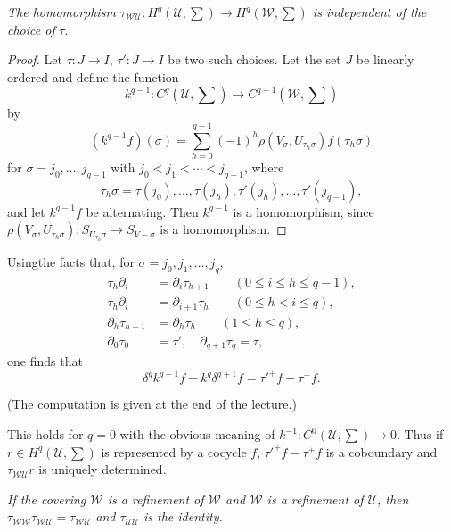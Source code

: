 \textit{The homomorphism $\tau_{\mathscr{W} \mathscr{U}} : H^q
  (\mathscr{U}, \sum) \to H^q (\mathscr{W}, \sum) $ is independent of
  the choice of}  $\tau$. 

\begin{proof}%
Let $\tau : J \to I$, $\tau' : J \to I$ be two such choices. Let the
set $J$ be linearly ordered and define the function 
$$
k^{q-1} : C^q (\mathscr{U}, \sum) \to C^{q-1} (\mathscr{W}, \sum)  
$$
by
$$
(k^{q-1} f) (\sigma) = \sum^{q-1}_{h=0}(-1)^h \rho(V_\sigma, U_{\tau_h
  \sigma}) f(\tau_h \sigma)  
$$
for $\sigma = j_0 , \ldots , j_{q-1}$ with $j_0 < j_1 < \cdots <
j_{q-1}$, where 
$$
\tau_h \sigma = \tau(j_0), \ldots , \tau(j_h), \tau'(j_h), \ldots ,
\tau'(j_{q-1}), 
$$
and let $k^{q-1} f$ be alternating. Then $k^{q-1}$ is a homomorphism,
since \break $\rho (V_{\sigma}, U_{\tau_h \sigma}) : S_{U_{\tau_h} \sigma}
\to S_{V- \sigma}$ is a homomorphism. 
\end{proof}

Using\pageoriginale the facts that, for $\sigma = j_0, j_1, \ldots ,
j_q$, 
\begin{align*}
\tau_h \partial_i & = \partial_i \tau_{h+1}  \qquad  (0 \le i \le h \le q-1),\\
\tau_h \partial_i & = \partial_{i+1} \tau_h   \qquad (0 \le h < 
i \le q),\\ 
\partial_h \tau_{h-1} & = \partial_h \tau_h   \qquad (1 \le h \le q),\\
\partial_0 \tau_0 & = \tau' , \quad \partial_{q+1} \tau_q = \tau ,
\end{align*}
one finds that
$$
\delta^q k^{q-1} f + k^q \delta^{q+1} f = \tau'^+ f - \tau^+ f .  
$$

(The computation is given at the end of the lecture.)

This holds for $q=0$ with the obvious meaning of $k^{-1} : C^0
(\mathscr{U} , \sum) \to 0$. Thus if $r \in H^q (\mathscr{U}, \sum)$
is represented by a cocycle $f$, $\tau'^+ f - \tau^+ f$ is a coboundary
and $\tau_{\mathscr{W} \mathscr{U}} r$ is uniquely determined. 

\textit{If the covering $\mathscr{W}$ is a refinement of $\mathscr{W}$
  and $\mathscr{W}$ is a refinement of $\mathscr{U}$, then
  $\tau_{\mathscr{W} \mathscr{W}} \tau_{\mathscr{W} \mathscr{U}} =
  \tau_{\mathscr{W} \mathscr{U} }$ and $\tau_{\mathscr{U}
    \mathscr{U}}$ is the identity.} 

